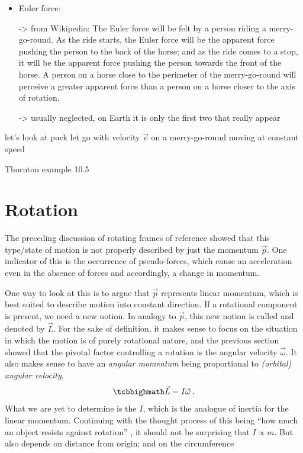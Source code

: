 \documentclass[../class_mech_main.tex]{subfiles}
\begin{document}
\begin{itemize}
    \item Euler force: 
    
    -> from Wikipedia: The Euler force will be felt by a person riding a merry-go-round. As the ride starts, the Euler force will be the apparent force pushing the person to the back of the horse; and as the ride comes to a stop, it will be the apparent force pushing the person towards the front of the horse. A person on a horse close to the perimeter of the merry-go-round will perceive a greater apparent force than a person on a horse closer to the axis of rotation. 
    
    -> usually neglected, on Earth it is only the first two that really appear
\end{itemize}



\begin{ex}

	let's look at puck let go with velocity $\vec{v}$ on a merry-go-round moving at constant speed
\end{ex}



\begin{ex}
	Thornton example 10.5
\end{ex}



	\section{Rotation}
% 
% 
The preceding discussion of rotating frames of reference showed that this type/state of motion is not properly described by just the momentum $\vec{p}$. One indicator of this is the occurrence of pseudo-forces, which cause an acceleration even in the absence of forces and accordingly, a change in momentum.

One way to look at this is to argue that $\vec{p}$ represents linear momentum, which is best suited to describe motion into constant direction. If a rotational component is present, we need a new notion. In analogy to $\vec{p}$, this new notion is called  and denoted by $\vec{L}$. For the sake of definition, it makes sense to focus on the situation in which the motion is of purely rotational nature, and the previous section showed that the pivotal factor controlling a rotation is the angular velocity $\vec{\omega}$. It also makes sense to have an \emph{angular momentum} being proportional to \emph{(orbital) angular velocity},
\begin{equation}
	\eqbox{\vec{L} = I \vec{\omega}} \, .
\end{equation}
What we are yet to determine is the  $I$, which is the analogue of inertia for the linear momentum. Continuing with the thought process of this being \enquote{how much an object resists against rotation} , it should not be surprising that $I \propto m$.
But also depends on distance from origin; and on the circumference
\end{document}
